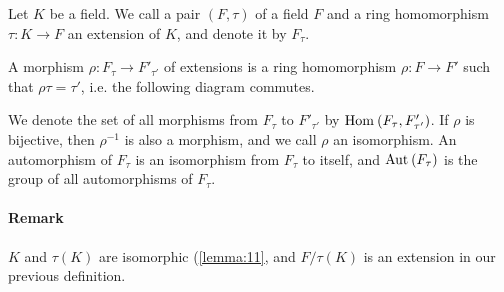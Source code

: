\begin{definition}
  \label{def:89}
  Let $K$ be a field. We call a pair $(F, \tau)$ of a field $F$ and a ring homomorphism $\tau : K \rightarrow F$ an extension of $K$, and denote it by $F_\tau$. 

A morphism $\rho : F_\tau \rightarrow F'_{\tau'}$ of extensions is a ring homomorphism $\rho : F \rightarrow F'$ such that $\rho\tau = \tau'$, i.e. the following diagram commutes.
  \begin{figure}[H]
    \centering
  \end{figure}
We denote the set of all morphisms from $F_\tau$ to $F'_{\tau'}$ by $\homset[]{F_\tau}{F'_{\tau'}}$. If $\rho$ is bijective, then $\rho^{-1}$ is also a morphism, and we call $\rho$ an isomorphism. An automorphism of $F_\tau$ is an isomorphism from $F_\tau$ to itself, and $\autset[]{F_\tau}$ is the group of all automorphisms of $F_\tau$.
\end{definition}

\paragraph{Remark}

$K$ and $\tau(K)$ are isomorphic (\autoref{lemma:11}, and $F/\tau(K)$ is an extension in our previous definition.

